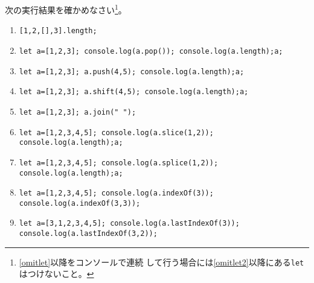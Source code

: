 \begin{Prob}\upshape
 次の実行結果を確かめなさい\footnote{\ref{omitlet}以降をコンソールで連続
 して行う場合には\ref{omitlet2}以降にある\texttt{let}はつけないこと。}。
\begin{enumerate}\upshape
 \item \texttt{[1,2,[],3].length;}
 \item \texttt{let a=[1,2,3]; console.log(a.pop());
       console.log(a.length);a;}\label{omitlet}
 \item \texttt{let a=[1,2,3]; a.push(4,5); console.log(a.length);a;}\label{omitlet2}
 \item \texttt{let a=[1,2,3]; a.shift(4,5); console.log(a.length);a;}
 \item \texttt{let a=[1,2,3]; a.join(" ");}
 \item \texttt{let a=[1,2,3,4,5]; console.log(a.slice(1,2)); console.log(a.length);a;}
 \item \texttt{let a=[1,2,3,4,5]; console.log(a.splice(1,2)); console.log(a.length);a;}
 \item \texttt{let a=[1,2,3,4,5]; console.log(a.indexOf(3)); console.log(a.indexOf(3,3));}
 \item \texttt{let a=[3,1,2,3,4,5]; console.log(a.lastIndexOf(3)); console.log(a.lastIndexOf(3,2));}
\end{enumerate}
\end{Prob}
